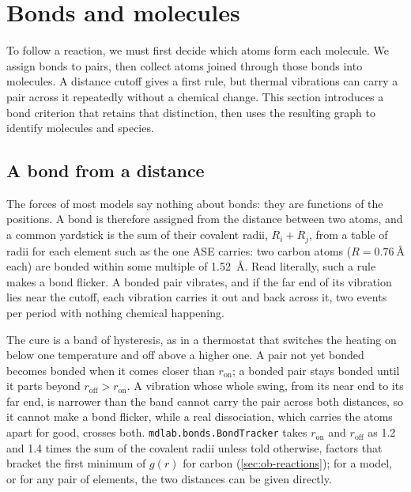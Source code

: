 \section{Bonds and molecules}
\label{sec:ob-bonds}

To follow a reaction, we must first decide which atoms form each
molecule. We assign bonds to pairs, then collect atoms joined through
those bonds into molecules. A distance cutoff gives a first rule, but
thermal vibrations can carry a pair across it repeatedly without a
chemical change. This section introduces a bond criterion that retains
that distinction, then uses the resulting graph to identify molecules
and species.

\subsection*{A bond from a distance}

The forces of most models say nothing about bonds: they are functions of
the positions. A bond is therefore assigned from the distance between
two atoms, and a common yardstick is the sum of their covalent radii,
$R_i + R_j$, from a table of radii for each element such as the one ASE
carries\cite{Larsen2017}: two carbon atoms ($R = \SI{0.76}{\angstrom}$
each) are bonded within some multiple of \SI{1.52}{\angstrom}. Read
literally, such a rule makes a bond flicker. A bonded pair vibrates, and
if the far end of its vibration lies near the cutoff, each vibration
carries it out and back across it, two events per period with nothing
chemical happening.

The cure is a band of hysteresis, as in a thermostat that switches the
heating on below one temperature and off above a higher one. A pair not
yet bonded becomes bonded when it comes closer than $r_{\mathrm{on}}$; a
bonded pair stays bonded until it parts beyond $r_{\mathrm{off}} >
r_{\mathrm{on}}$. A vibration whose whole swing, from its near end to its
far end, is narrower than the band cannot carry the pair across both
distances, so it cannot make a bond flicker, while a real dissociation,
which carries the atoms apart for good, crosses both. \texttt{mdlab.bonds.BondTracker} takes
$r_{\mathrm{on}}$ and $r_{\mathrm{off}}$ as 1.2 and 1.4 times the sum of
the covalent radii unless told otherwise, factors that bracket the first
minimum of $g(r)$ for carbon (\cref{sec:ob-reactions}); for a model, or
for any pair of elements, the two distances can be given directly.

